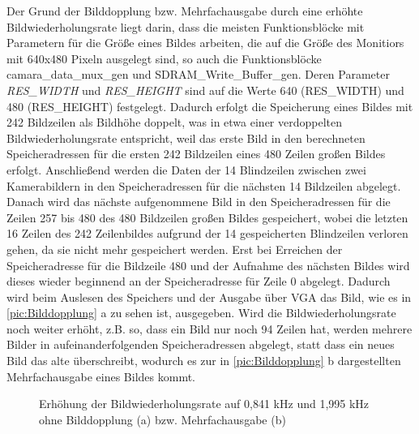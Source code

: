 \documentclass[ngerman,12pt]{article} %
\begin{document}
{Der Grund der Bilddopplung bzw. Mehrfachausgabe durch eine erhöhte Bildwiederholungsrate liegt darin, dass die meisten Funktionsblöcke mit Parametern für die Größe eines Bildes arbeiten, die auf die Größe des Monitiors mit 640x480 Pixeln ausgelegt sind, so auch die Funktionsblöcke camara\_data\_mux\_gen und SDRAM\_Write\_Buffer\_gen. Deren Parameter \textit{RES\_WIDTH} und \textit{RES\_HEIGHT} sind auf die Werte 640 (RES\_WIDTH) und 480 (RES\_HEIGHT) festgelegt. Dadurch erfolgt die Speicherung eines Bildes mit 242 Bildzeilen als Bildhöhe doppelt, was in etwa einer verdoppelten Bildwiederholungsrate entspricht, weil das erste Bild in den berechneten Speicheradressen für die ersten 242 Bildzeilen eines 480 Zeilen großen Bildes erfolgt. Anschließend werden die Daten der 14 Blindzeilen zwischen zwei Kamerabildern in den Speicheradressen für die nächsten 14 Bildzeilen abgelegt. Danach wird das nächste aufgenommene Bild in den Speicheradressen für die Zeilen 257 bis 480 des 480 Bildzeilen großen Bildes gespeichert, wobei die letzten 16 Zeilen des 242 Zeilenbildes aufgrund der 14 gespeicherten Blindzeilen verloren gehen, da sie nicht mehr gespeichert werden. Erst bei Erreichen der Speicheradresse für die Bildzeile 480 und der Aufnahme des nächsten Bildes wird dieses wieder beginnend an der Speicheradresse für Zeile 0 abgelegt. Dadurch wird beim Auslesen des Speichers und der Ausgabe über VGA das Bild, wie es in \autoref{pic:Bilddopplung} a zu sehen ist, ausgegeben. Wird die Bildwiederholungsrate noch weiter erhöht, z.B. so, dass ein Bild nur noch 94 Zeilen hat, werden mehrere Bilder in aufeinanderfolgenden Speicheradressen abgelegt, statt dass ein neues Bild das alte überschreibt, wodurch es zur in \autoref{pic:Bilddopplung} b dargestellten Mehrfachausgabe eines Bildes kommt.\\

\begin{figure}
  \centering
  \qquad
  \caption[Erhöhung der Bildwiederholungsrate auf 0,841 kHz und 1,995 kHz ohne Bilddopplung bzw. Mehrfachausgabe]{\label{pic:Bilddopplung_gelöst}Erhöhung der Bildwiederholungsrate auf 0,841 kHz und 1,995 kHz ohne Bilddopplung (a) bzw. Mehrfachausgabe (b)}
\end{figure}

}
\end{document}
